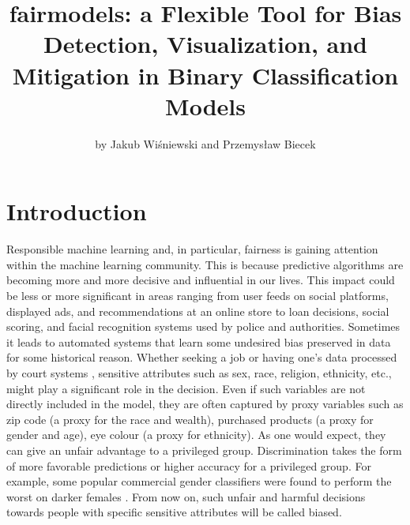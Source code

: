 \title{fairmodels: a Flexible Tool for Bias Detection, Visualization,
and Mitigation in Binary Classification Models}
\author{by Jakub Wiśniewski and Przemysław Biecek}

\maketitle


\hypertarget{introduction}{%
\section{Introduction}\label{introduction}}

Responsible machine learning and, in particular, fairness is gaining
attention within the machine learning community. This is because
predictive algorithms are becoming more and more decisive and
influential in our lives. This impact could be less or more significant
in areas ranging from user feeds on social platforms, displayed ads, and
recommendations at an online store to loan decisions, social scoring,
and facial recognition systems used by police and authorities. Sometimes
it leads to automated systems that learn some undesired bias preserved
in data for some historical reason. Whether seeking a job
\citep{8731591} or having one's data processed by court systems
\citep{propublica}, sensitive attributes such as sex, race, religion,
ethnicity, etc., might play a significant role in the decision. Even if
such variables are not directly included in the model, they are often
captured by proxy variables such as zip code (a proxy for the race and
wealth), purchased products (a proxy for gender and age), eye colour (a
proxy for ethnicity). As one would expect, they can give an unfair
advantage to a privileged group. Discrimination takes the form of more
favorable predictions or higher accuracy for a privileged group. For
example, some popular commercial gender classifiers were found to
perform the worst on darker females \citep{pmlr-v81-buolamwini18a}. From
now on, such unfair and harmful decisions towards people with specific
sensitive attributes will be called biased.


